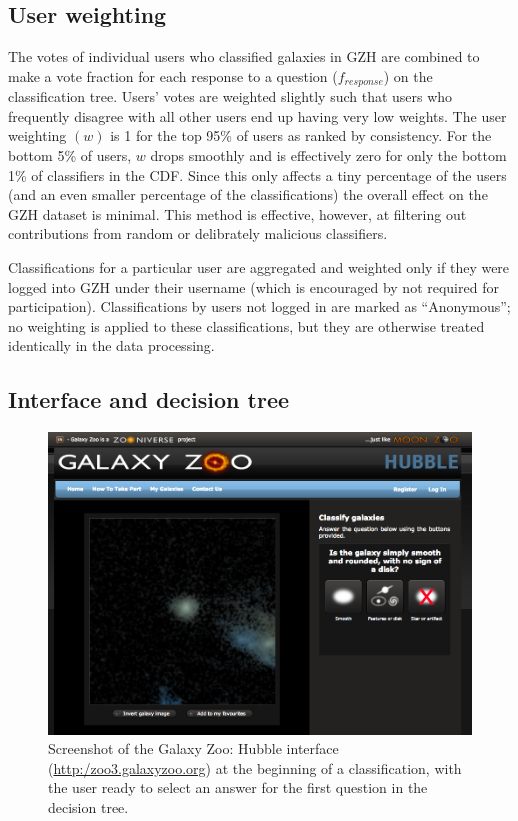 \documentclass[twocolumn]{aastex6}
\begin{document}
\subsection{User weighting}\label{ssec:weighting}
The votes of individual users who classified galaxies in GZH are combined to make a vote fraction for each response to a question ($f_{response}$) on the classification tree. Users' votes are weighted slightly \citep[in a method identical to that described in][]{wil13} such that users who frequently disagree with all other users end up having very low weights. The user weighting $(w)$ is 1 for the top 95\% of users as ranked by consistency. For the bottom 5\% of users, $w$ drops smoothly and is effectively zero for only the bottom 1\% of classifiers in the CDF. Since this only affects a tiny percentage of the users (and an even smaller percentage of the classifications) the overall effect on the GZH dataset is minimal. This method is effective, however, at filtering out contributions from random or delibrately malicious classifiers.

Classifications for a particular user are aggregated and weighted only if they were logged into GZH under their username (which is encouraged by not required for participation). Classifications by users not logged in are marked as ``Anonymous''; no weighting is applied to these classifications, but they are otherwise treated identically in the data processing. 

\subsection{Interface and decision tree}\label{ssec:interface}

\begin{figure}
\center
\includegraphics[width=160mm]{figures/gzh_interface.png}
\caption{Screenshot of the Galaxy Zoo: Hubble interface (\url{http:/zoo3.galaxyzoo.org}) at the beginning of a classification, with the user ready to select an answer for the first question in the decision tree.\label{fig:interface}}
\end{figure}
\end{document}
